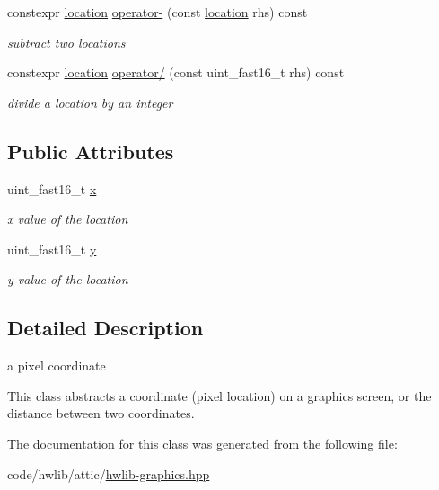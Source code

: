 \begin{DoxyCompactItemize}
\mbox{\label{classhwlib_1_1location_aa2f9e40820aaf4326fa1da48228be3c8}} 
constexpr \hyperlink{classhwlib_1_1location}{location} \hyperlink{classhwlib_1_1location_aa2f9e40820aaf4326fa1da48228be3c8}{operator-\/} (const \hyperlink{classhwlib_1_1location}{location} rhs) const
\begin{DoxyCompactList}\small\item\em subtract two locations \end{DoxyCompactList}\item 
\mbox{\label{classhwlib_1_1location_a2405c09229844f0694c4e9899142658b}} 
constexpr \hyperlink{classhwlib_1_1location}{location} \hyperlink{classhwlib_1_1location_a2405c09229844f0694c4e9899142658b}{operator/} (const uint\+\_\+fast16\+\_\+t rhs) const
\begin{DoxyCompactList}\small\item\em divide a location by an integer \end{DoxyCompactList}\end{DoxyCompactItemize}
\subsection*{Public Attributes}
\begin{DoxyCompactItemize}
\item 
\mbox{\label{classhwlib_1_1location_ac55b8b176b07e8520699e417149c79d6}} 
uint\+\_\+fast16\+\_\+t \hyperlink{classhwlib_1_1location_ac55b8b176b07e8520699e417149c79d6}{x}
\begin{DoxyCompactList}\small\item\em x value of the location \end{DoxyCompactList}\item 
\mbox{\label{classhwlib_1_1location_a5e29ae3b19fd02b792dd79cec47f2cc3}} 
uint\+\_\+fast16\+\_\+t \hyperlink{classhwlib_1_1location_a5e29ae3b19fd02b792dd79cec47f2cc3}{y}
\begin{DoxyCompactList}\small\item\em y value of the location \end{DoxyCompactList}\end{DoxyCompactItemize}


\subsection{Detailed Description}
a pixel coordinate 

This class abstracts a coordinate (pixel location) on a graphics screen, or the distance between two coordinates. 

The documentation for this class was generated from the following file\+:\begin{DoxyCompactItemize}
\item 
code/hwlib/attic/\hyperlink{hwlib-graphics_8hpp}{hwlib-\/graphics.\+hpp}\end{DoxyCompactItemize}
